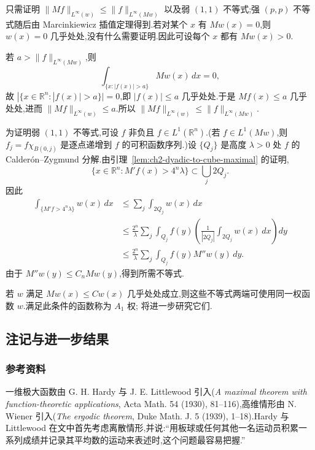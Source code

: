 \begin{Proof}
只需证明 $\|Mf\|_{L^\infty(w)}\le\|f\|_{L^\infty(Mw)}$ 以及弱 $(1,1)$ 不等式;强 $(p,p)$ 不等式随后由 Marcinkiewicz 插值定理得到.若对某个 $x$ 有 $Mw(x)=0$,则 $w(x)=0$ 几乎处处,没有什么需要证明.因此可设每个 $x$ 都有 $Mw(x)>0$.

\hypertarget{sample-page-050}{}
若 $a>\|f\|_{L^\infty(Mw)}$,则
\[
 \int_{\{x:|f(x)|>a\}}Mw(x)\,dx=0,
\]
故 $|\{x\in\mathbb R^n:|f(x)|>a\}|=0$,即 $|f(x)|\le a$ 几乎处处.于是 $Mf(x)\le a$ 几乎处处,进而 $\|Mf\|_{L^\infty(w)}\le a$.所以
$\|Mf\|_{L^\infty(w)}\le\|f\|_{L^\infty(Mw)}$.

为证明弱 $(1,1)$ 不等式,可设 $f$ 非负且 $f\in L^1(\mathbb R^n)$.(若 $f\in L^1(Mw)$,则 $f_j=f\chi_{B(0,j)}$ 是逐点递增到 $f$ 的可积函数序列.)设 $\{Q_j\}$ 是高度 $\lambda>0$ 处 $f$ 的 Calderón--Zygmund 分解.由引理~\ref{lem:ch2-dyadic-to-cube-maximal} 的证明,
\[
 \{x\in\mathbb R^n:M'f(x)>4^n\lambda\}\subset\bigcup_j2Q_j.
\]
因此
\[
\begin{aligned}
 \int_{\{M'f>4^n\lambda\}}w(x)\,dx
 &\le\sum_j\int_{2Q_j}w(x)\,dx\\
 &\le\frac{2^n}{\lambda}\sum_j\int_{Q_j}f(y)
 \left(\frac1{|2Q_j|}\int_{2Q_j}w(x)\,dx\right)dy\\
 &\le\frac{2^n}{\lambda}\sum_j\int_{Q_j}f(y)M''w(y)\,dy.
\end{aligned}
\]
由于 $M''w(y)\le C_nMw(y)$,得到所需不等式.
\end{Proof}

若 $w$ 满足 $Mw(x)\le Cw(x)$ 几乎处处成立,则这些不等式两端可使用同一权函数 $w$.满足此条件的函数称为 $A_1$ 权; 将进一步研究它们.

\subsection{注记与进一步结果}
\label{sec:ch2-notes-further-results}
\subsubsection{参考资料}
\label{subsec:ch2-references}

一维极大函数由 G. H. Hardy 与 J. E. Littlewood 引入(\emph{A maximal theorem with function-theoretic applications}, Acta Math. 54 (1930), 81--116),高维情形由 N. Wiener 引入(\emph{The ergodic theorem}, Duke Math. J. 5 (1939), 1--18).Hardy 与 Littlewood 在文中首先考虑离散情形,并说:“用板球或任何其他一名运动员积累一系列成绩并记录其平均数的运动来表述时,这个问题最容易把握.”

